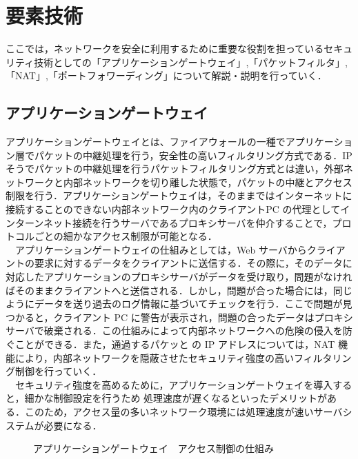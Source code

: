 \documentclass[a4j,titlepage]{jarticle}
\begin{document}
\section{要素技術}
ここでは，ネットワークを安全に利用するために重要な役割を担っているセキュリティ技術としての「アプリケーションゲートウェイ」,「パケットフィルタ」,「NAT」,「ポートフォワーディング」について解説・説明を行っていく．

\subsection{アプリケーションゲートウェイ}
アプリケーションゲートウェイとは、ファイアウォールの一種でアプリケーション層でパケットの中継処理を行う，安全性の高いフィルタリング方式である．IP そうでパケットの中継処理を行うパケットフィルタリング方式とは違い，外部ネットワークと内部ネットワークを切り離した状態で，パケットの中継とアクセス制限を行う．アプリケーションゲートウェイは，そのままではインターネットに接続することのできない内部ネットワーク内のクライアントPC の代理としてインターンネット接続を行うサーバであるプロキシサーバを仲介することで，プロトコルごとの細かなアクセス制限が可能となる．\\
　アプリケーションゲートウェイの仕組みとしては，Web サーバからクライアントの要求に対するデータをクライアントに送信する．その際に，そのデータに対応したアプリケーションのプロキシサーバがデータを受け取り，問題がなければそのままクライアントへと送信される．しかし，問題が合った場合には，同じようにデータを送り過去のログ情報に基づいてチェックを行う．ここで問題が見つかると，クライアント PC に警告が表示され，問題の合ったデータはプロキシサーバで破棄される．この仕組みによって内部ネットワークへの危険の侵入を防ぐことができる．また，通過するパケッと の IP アドレスについては，NAT 機能により，内部ネットワークを隠蔽させたセキュリティ強度の高いフィルタリング制御を行っていく．\\
　セキュリティ強度を高めるために，アプリケーションゲートウェイを導入すると，細かな制御設定を行うため
処理速度が遅くなるといったデメリットがある．このため，アクセス量の多いネットワーク環境には処理速度が速いサーバシステムが必要になる\cite{bib:aptext}．

  \begin{figure}[htbp]
    \begin{center}
      \caption{アプリケーションゲートウェイ　アクセス制御の仕組み}
     \label{fig:apuri}
   \end{center}
  \end{figure}
\end{document}
